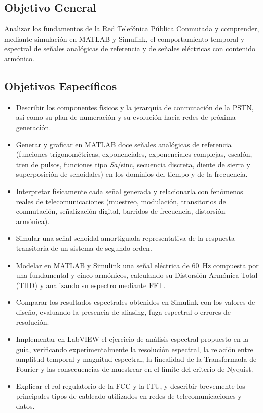 \documentclass[conference]{IEEEtran}
\begin{document}
\subsection{Objetivo General}
Analizar los fundamentos de la Red Telefónica Pública Conmutada y comprender, mediante simulación en MATLAB y Simulink, el comportamiento temporal y espectral de señales analógicas de referencia y de señales eléctricas con contenido armónico.

\subsection{Objetivos Específicos}
\begin{itemize}
    \item Describir los componentes físicos y la jerarquía de conmutación de la PSTN, así como su plan de numeración y su evolución hacia redes de próxima generación.
    \item Generar y graficar en MATLAB doce señales analógicas de referencia (funciones trigonométricas, exponenciales, exponenciales complejas, escalón, tren de pulsos, funciones tipo \textit{Sa}/sinc, secuencia discreta, diente de sierra y superposición de senoidales) en los dominios del tiempo y de la frecuencia.
    \item Interpretar físicamente cada señal generada y relacionarla con fenómenos reales de telecomunicaciones (muestreo, modulación, transitorios de conmutación, señalización digital, barridos de frecuencia, distorsión armónica).
    \item Simular una señal senoidal amortiguada representativa de la respuesta transitoria de un sistema de segundo orden.
    \item Modelar en MATLAB y Simulink una señal eléctrica de 60~Hz compuesta por una fundamental y cinco armónicos, calculando su Distorsión Armónica Total (THD) y analizando su espectro mediante FFT.
    \item Comparar los resultados espectrales obtenidos en Simulink con los valores de diseño, evaluando la presencia de aliasing, fuga espectral o errores de resolución.
    \item Implementar en LabVIEW el ejercicio de análisis espectral propuesto en la guía, verificando experimentalmente la resolución espectral, la relación entre amplitud temporal y magnitud espectral, la linealidad de la Transformada de Fourier y las consecuencias de muestrear en el límite del criterio de Nyquist.
    \item Explicar el rol regulatorio de la FCC y la ITU, y describir brevemente los principales tipos de cableado utilizados en redes de telecomunicaciones y datos.
\end{itemize}
\end{document}
